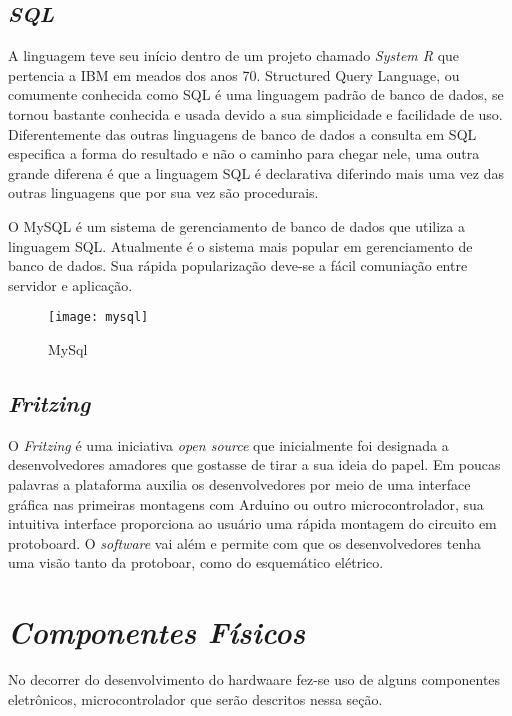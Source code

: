 \subsection[\textit{SQL}]{\textit{SQL}}\label{sql}
A linguagem teve seu início dentro de um projeto chamado \textit{System R} que pertencia a IBM em meados dos anos 70. Structured Query Language, ou
comumente conhecida como SQL é uma linguagem padrão de banco de dados, se tornou bastante conhecida e usada devido a sua simplicidade e facilidade 
de uso. Diferentemente das outras linguagens de banco de dados a consulta em SQL especifica a forma do resultado e não o caminho para chegar nele, uma outra
grande diferena é que a linguagem SQL é declarativa diferindo mais uma vez das outras linguagens que por sua vez são procedurais.

O MySQL é um sistema de gerenciamento de banco de dados que utiliza a linguagem SQL. Atualmente é o sistema mais popular em gerenciamento de 
banco de dados. Sua rápida popularização deve-se a fácil comuniação entre servidor e aplicação. 

\begin{figure}[h!]
	\texttt{[image: mysql]}
	\centering
	\caption[MySQL]{MySql}
	\label{fig:mysql-image}
\end{figure}
\FloatBarrier

\subsection[\textit{Fritzing}]{\textit{Fritzing}}\label{fritzing}
O \textit{Fritzing} é uma iniciativa \textit{open source} que inicialmente foi
designada a desenvolvedores amadores que gostasse de tirar a sua ideia do papel. Em poucas palavras
a plataforma auxilia os desenvolvedores por meio de uma interface gráfica nas primeiras montagens com Arduino
ou outro microcontrolador, sua intuitiva interface proporciona ao usuário uma rápida montagem do circuito em protoboard. O \textit{software} vai além
e permite com que os desenvolvedores tenha uma visão tanto da protoboar, como do esquemático elétrico. 


\section[\textit{Componentes Físicos}]{\textit{Componentes Físicos}}\label{comp-fisico}
No decorrer do desenvolvimento do hardwaare fez-se uso de alguns componentes eletrônicos, microcontrolador que serão descritos nessa seção.

